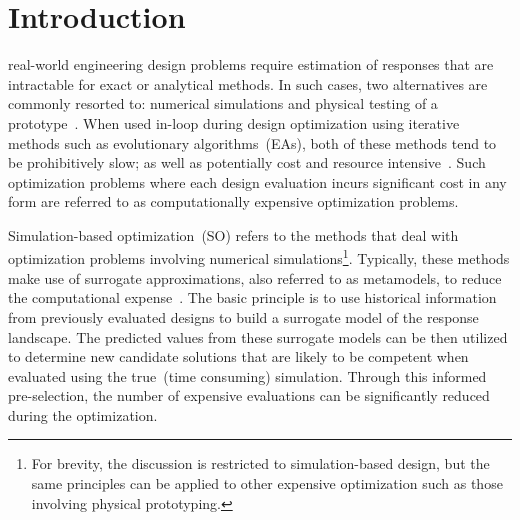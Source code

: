 \section{Introduction}
% 
% 
% 
% 

 real-world engineering design problems require estimation of responses that are intractable for exact or analytical methods. In such cases, two alternatives are commonly resorted to: numerical simulations and physical testing of a prototype~\cite{forrester2008engineering}. When used in-loop during design optimization using iterative methods such as evolutionary algorithms~(EAs), both of these methods tend to be prohibitively slow; as well as potentially cost and resource intensive~\cite{jin2009systems}. Such optimization problems where each design evaluation incurs significant cost in any form are referred to as computationally expensive optimization problems.

Simulation-based optimization~(SO) refers to the methods that deal with optimization problems involving  numerical simulations\footnote{For brevity, the discussion is restricted to simulation-based design, but the same principles can be applied to other expensive optimization such as those involving physical prototyping.}. Typically, these methods make use of surrogate approximations, also referred to as metamodels, to reduce the computational expense~\cite{amaran2016simulation}. The basic principle is to use historical information from previously evaluated designs to build a surrogate model of the response landscape. The predicted values from these surrogate models can be then utilized to determine new candidate solutions that are likely to be competent when evaluated using the true~(time consuming) simulation. Through this informed pre-selection, the number of expensive evaluations can be significantly reduced during the optimization. 


